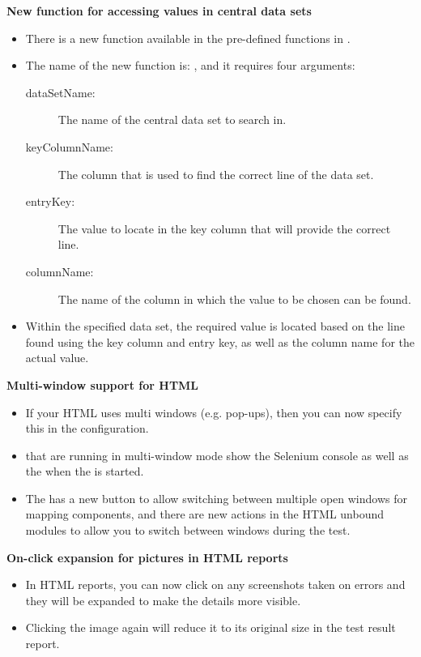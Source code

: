 \textbf{New function for accessing values in central data sets}
\begin{itemize}
\item There is a new function available in the pre-defined functions in \app{}.
\item The name of the new function is: , and it requires four arguments:
\begin{description}
\item [dataSetName:]{The name of the central data set to search in.}
\item [keyColumnName:]{The column that is used to find the correct line of the data set.}
\item [entryKey:]{The value to locate in the key column that will provide the correct line.}
\item [columnName:]{The name of the column in which the value to be chosen can be found.}
\end{description}
\item Within the specified data set, the required value is located based on the line found using the key column and entry key, as well as the column name for the actual value. 
\end{itemize}

\textbf{Multi-window support for HTML \gdauts{}}
\begin{itemize}
\item If your HTML \gdaut{} uses multi windows (e.g. pop-ups), then you can now specify this in the \gdaut{} configuration. 
\item \gdauts{} that are running in multi-window mode show the Selenium console as well as the \gdaut{} when the \gdaut{} is started. 
\item The \gdomeditor{} has a new button to allow switching between multiple open windows for mapping components, and there are new actions in the HTML unbound modules to allow you to switch between windows during the test. 
\end{itemize}

\textbf{On-click expansion for pictures in HTML reports}
\begin{itemize}
\item In HTML reports, you can now click on any screenshots taken on errors and they will be expanded to make the details more visible.
\item Clicking the image again will reduce it to its original size in the test result report.
\end{itemize}
